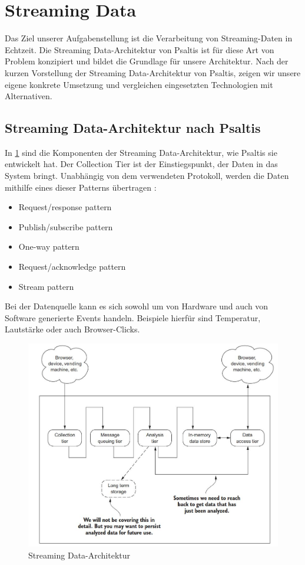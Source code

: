 \section{Streaming Data}

Das Ziel unserer Aufgabenstellung ist die Verarbeitung von Streaming-Daten in Echtzeit. Die Streaming Data-Architektur
von Psaltis \cite{psaltis2017streaming} ist für diese Art von Problem konzipiert und bildet die Grundlage für
unsere Architektur. Nach der kurzen Vorstellung der Streaming Data-Architektur von Psaltis, zeigen wir unsere eigene konkrete
Umsetzung und vergleichen eingesetzten Technologien mit Alternativen.

\subsection{Streaming Data-Architektur nach Psaltis}

In \ref{fig:streaming_data_architecture-psaltis} sind die Komponenten der Streaming Data-Architektur, wie Psaltis \cite{psaltis2017streaming}
sie entwickelt hat. Der Collection Tier ist der Einstiegspunkt, der Daten in das System bringt. Unabhängig von dem verwendeten
Protokoll, werden die Daten mithilfe eines dieser Patterns übertragen \cite{psaltis2017streaming}:
\begin{itemize}
    \item Request/response pattern
    \item Publish/subscribe pattern
    \item One-way pattern
    \item Request/acknowledge pattern
    \item Stream pattern
\end{itemize}

Bei der Datenquelle kann es sich sowohl um von Hardware und auch von Software generierte Events handeln. Beispiele hierfür sind
Temperatur, Lautstärke oder auch Browser-Clicks.

\begin{figure}[h]
    \includegraphics[width=.5\textwidth]{images/streaming_data_architecture-psaltis.jpg}
    \caption{Streaming Data-Architektur \cite{psaltis2017streaming}}
    \label{fig:streaming_data_architecture-psaltis}
\end{figure}

